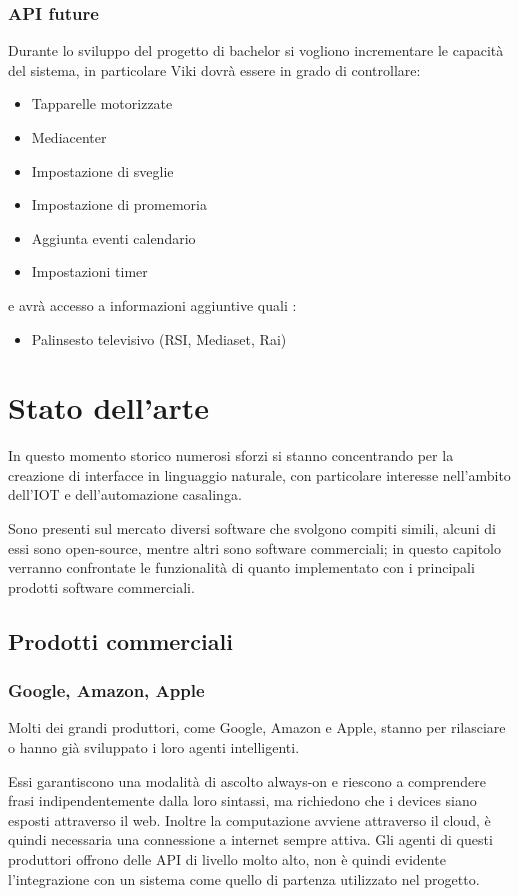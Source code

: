 \documentclass[twoside]{supsistudent}
\begin{document}
\subsection{API future}
Durante lo sviluppo del progetto di bachelor si vogliono incrementare le capacità del sistema, in particolare Viki dovrà essere in grado di controllare:
\begin{itemize}
  \item Tapparelle motorizzate
  \item Mediacenter
  \item Impostazione di sveglie
  \item Impostazione di promemoria
  \item Aggiunta eventi calendario
  \item Impostazioni timer
\end{itemize}
e avrà accesso a informazioni aggiuntive quali :
\begin{itemize}
  \item Palinsesto televisivo (RSI, Mediaset, Rai)
\end{itemize}

\chapter{Stato dell'arte}

In questo momento storico numerosi sforzi si stanno concentrando per la creazione di interfacce in linguaggio naturale, con particolare interesse nell'ambito dell'IOT  e dell'automazione casalinga. 

Sono presenti sul mercato diversi software che svolgono compiti simili, alcuni di essi sono open-source, mentre altri sono software commerciali; in questo capitolo verranno confrontate le funzionalità di quanto implementato con i principali prodotti software commerciali.
\section{Prodotti commerciali}
\subsection{Google, Amazon, Apple}
Molti dei grandi produttori, come Google, Amazon e Apple, stanno per rilasciare o hanno già sviluppato i loro agenti intelligenti. \cite{googleAgent}\cite{homekit}\cite{alexa}

Essi garantiscono una modalità di ascolto always-on e riescono a comprendere frasi indipendentemente dalla loro sintassi, ma richiedono che i devices siano esposti attraverso il web. Inoltre la computazione avviene attraverso il cloud, è quindi necessaria una connessione a internet sempre attiva.
Gli agenti di questi produttori offrono delle API di livello molto alto, non è quindi evidente l'integrazione con un sistema come quello di partenza utilizzato nel progetto.
\end{document}
